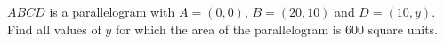 $ABCD$ is a parallelogram with $A=(0,0)$, $B=(20,10)$ and $D=(10,y)$. Find all values of $y$ for which the area of the parallelogram is $600$ square units.

